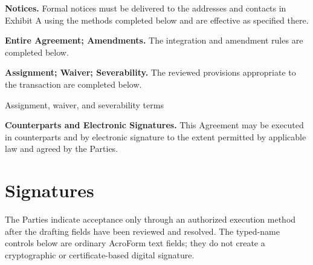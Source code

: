 \documentclass{linearspace-legal}
\begin{document}
\begin{LSForm}
\begin{legalclauses}

  \item \textbf{Notices.} Formal notices must be delivered to the addresses and
  contacts in Exhibit A using the methods completed below and are effective as
  specified there.


  \item \textbf{Entire Agreement; Amendments.} The integration and amendment
  rules are completed below.


  \item \textbf{Assignment; Waiver; Severability.} The reviewed provisions
  appropriate to the transaction are completed below.

    {Assignment, waiver, and severability terms}

  \item \textbf{Counterparts and Electronic Signatures.} This Agreement may be
  executed in counterparts and by electronic signature to the extent permitted
  by applicable law and agreed by the Parties.
\end{legalclauses}

\clearpage
\section{Signatures}

The Parties indicate acceptance only through an authorized execution method
after the drafting fields have been reviewed and resolved. The typed-name
controls below are ordinary AcroForm text fields; they do not create a
cryptographic or certificate-based digital signature.

\vspace{0.25in}
\noindent
{}
\hfill
{}


\end{LSForm}
\end{document}
